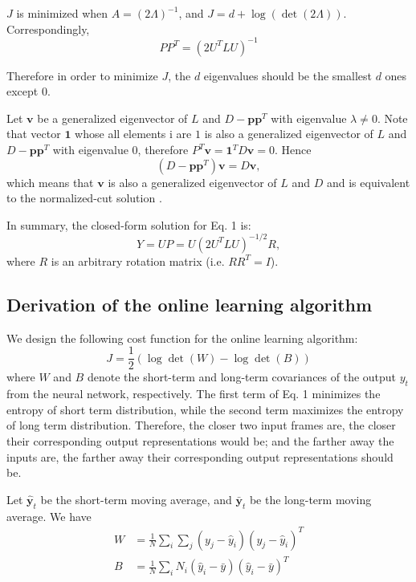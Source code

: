 \documentclass{article}
\begin{document}
$J$ is minimized when $A = (2\Lambda)^{-1}$, and $J = d + \log(\det(2\Lambda))$.
Correspondingly,
\begin{equation}
PP^T = (2U^TLU)^{-1}
\end{equation}

Therefore in order to minimize $J$, the $d$ eigenvalues should be the smallest
 $d$ ones except $0$.

Let $\mathbf{v}$ be a generalized eigenvector of $L$ and $D-\mathbf{pp}^T$ with
eigenvalue $\lambda \neq 0$. Note that vector $\mathbf{1}$ whose all elements i
are $1$ is also a generalized eigenvector of $L$ and $D-\mathbf{pp}^T$ with 
eigenvalue $0$, therefore $P^T\mathbf{v} = \mathbf{1}^TD\mathbf{v} = 0$. Hence
\begin{equation}
(D-\mathbf{pp}^T)\mathbf{v} = D\mathbf{v},
\end{equation} 
which means that $\mathbf{v}$ is also a generalized eigenvector of $L$ and $D$ and
 is equivalent to the normalized-cut solution \cite{Shi00}.

In summary, the closed-form solution for Eq. 1 is:
\begin{equation}
Y = UP = U(2U^TLU)^{-1/2}R,
\end{equation}
where $R$ is an arbitrary rotation matrix (i.e. $RR^T = I$).

\subsection{Derivation of the online learning algorithm}
We design the following cost function for the online learning algorithm:
\begin{equation}
J = \frac{1}{2}(\log\det(W) - \log\det(B))
\end{equation}
where $W$ and $B$ denote the short-term and long-term covariances of the output
$y_t$ from the neural network, respectively. The first term of Eq. 1 minimizes 
the entropy of short term distribution, while the second term maximizes the 
entropy of long term distribution. Therefore, the closer two input frames are,
the closer their corresponding output representations would be; and the farther
away the inputs are, the farther away their corresponding output representations
 should be. 

Let $\hat{\mathbf{y}}_t$ be the short-term moving average, and 
$\bar{\mathbf{y}}_t$ be the long-term moving average. We have
\begin{align}
W &= \frac{1}{N}\sum_i\sum_j(y_j - \hat{y}_i)(y_j - \hat{y}_i)^T \\
B &= \frac{1}{N}\sum_iN_i(\hat{y}_i - \bar{y})(\hat{y}_i - \bar{y})^T
\end{align}
\end{document}
